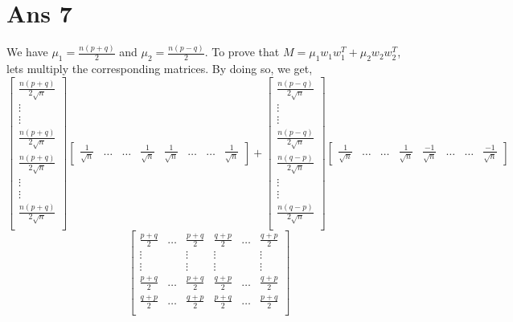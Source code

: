 \documentclass[10pt]{article}
\begin{document}
\section*{Ans 7}
\begin{flushleft}
We have $\mu_{1} = \frac{n (p+q)}{2}$ and $\mu_{2} = \frac{n (p-q)}{2}$. To prove that $M = \mu_{1}w_{1}w_{1}^{T} + \mu_{2}w_{2}w_{2}^{T}$, lets multiply the corresponding matrices. By doing so, we get,\\
$$
\begin{bmatrix}
\frac{n (p+q)}{2\sqrt n}\\
\vdots\\
\vdots\\
\frac{n (p+q)}{2\sqrt n}\\
\frac{n (p+q)}{2\sqrt n}\\
\vdots\\
\vdots\\
\frac{n (p+q)}{2\sqrt n}\\
\end{bmatrix}
\begin{bmatrix}
\frac{1}{\sqrt n} &\hdots &\hdots &\frac{1}{\sqrt n} &\frac{1}{\sqrt n} &\hdots &\hdots & \frac{1}{\sqrt n}
\end{bmatrix}
+ 
\begin{bmatrix}
\frac{n (p-q)}{2\sqrt n}\\
\vdots\\
\vdots\\
\frac{n (p-q)}{2\sqrt n}\\
\frac{n (q-p)}{2\sqrt n}\\
\vdots\\
\vdots\\
\frac{n (q-p)}{2\sqrt n}\\
\end{bmatrix}
\begin{bmatrix}
\frac{1}{\sqrt n} &\hdots &\hdots &\frac{1}{\sqrt n} &\frac{-1}{\sqrt n} &\hdots &\hdots & \frac{-1}{\sqrt n}
\end{bmatrix}
$$
$$
\begin{bmatrix} 
\frac{p+q}{2} & \hdots & \frac{p+q}{2} & \frac{q+p}{2}& \hdots & \frac{q+p}{2}\\
\vdots & & \vdots & \vdots & & \vdots\\
\vdots & & \vdots & \vdots & & \vdots\\
\frac{p+q}{2} & \hdots & \frac{p+q}{2} & \frac{q+p}{2} & \hdots & \frac{q+p}{2}\\
\frac{q+p}{2} & \hdots & \frac{q+p}{2} & \frac{p+q}{2} & \hdots & \frac{p+q}{2}\\ 

\end{bmatrix}$$
\end{flushleft}
\end{document}
